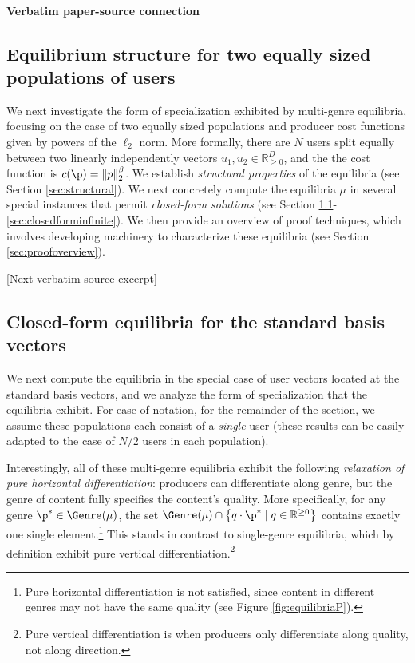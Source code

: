 \documentclass[10pt]{article}
\begin{document}
\paragraph{Verbatim paper-source connection}
\begin{ReviewVerbatim}
\section{Equilibrium structure for two equally sized populations of users}\label{sec:specialcases}

We next investigate the form of specialization exhibited by multi-genre equilibria, focusing on the case of {two equally sized populations} and producer cost functions given by powers of the $\ell_2$ norm. More formally, there are $N$ users split equally between two linearly independently vectors $u_1, u_2 \in \mathbb{R}_{\ge 0}^D$, and the the cost function is $c(\p) = \|p\|_2^{\beta}$. We establish \textit{structural properties} of the equilibria (see Section \ref{sec:structural}). We next concretely compute the equilibria $\mu$ in several special instances that permit \textit{closed-form solutions} (see Section \ref{sec:closedformsb}-\ref{sec:closedforminfinite}). We then provide an overview of proof techniques, which involves developing machinery to characterize these equilibria (see Section \ref{sec:proofoverview}).

[Next verbatim source excerpt]

\subsection{Closed-form equilibria for the standard basis vectors}\label{sec:closedformsb}
We next compute the equilibria in the special case of user vectors located at the standard basis vectors, and we analyze the form of specialization that the equilibria exhibit. For ease of notation, for the remainder of the section, we assume these populations each consist of a \textit{single} user (these results can be easily adapted to the case of $N/2$ users in each population).

Interestingly, all of these multi-genre equilibria exhibit the following \textit{relaxation of pure horizontal differentiation}: producers can differentiate along genre, but the genre of content fully specifies the content's quality. More specifically, for any genre $\p^* \in \Genre(\mu)$, the set $\Genre(\mu) \cap \left\{ q \cdot \p^* \mid q \in \mathbb{R}^{\ge 0}\right\}$ contains exactly one single element.\footnote{Pure horizontal differentiation is not satisfied, since content in different genres may not have the same quality (see Figure \ref{fig:equilibriaP}).} This stands in contrast to single-genre equilibria, which by definition exhibit pure vertical differentiation.\footnote{Pure vertical differentiation is when producers only differentiate along quality, not along direction.}
\end{ReviewVerbatim}
\end{document}
